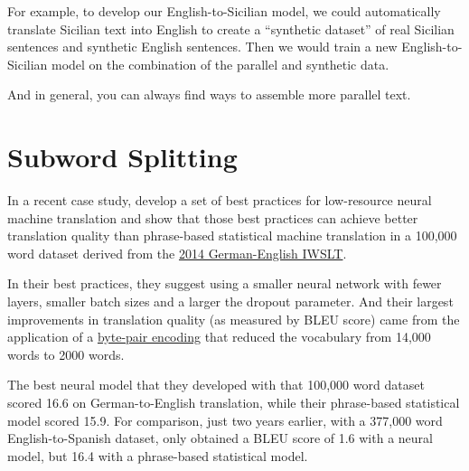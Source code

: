 \documentclass[10pt,letterpaper]{article}
\begin{document}


For example, to develop our English-to-Sicilian model, we could automatically translate
Sicilian text into English to create a ``synthetic dataset'' of real Sicilian sentences
and synthetic English sentences.  Then we would train a new English-to-Sicilian model on the
combination of the parallel and synthetic data.

And in general, you can always find ways to assemble more parallel text.



\hypertarget{subword}{}

\section*{Subword Splitting}

In a recent case study, \citet{sennrich2019loresnmt}
develop a set of best practices for low-resource neural machine translation and
show that those best practices can achieve better translation quality than
phrase-based statistical machine translation in a 100,000 word dataset derived from the
\href{https://sites.google.com/site/iwsltevaluation2014/}{2014 German-English IWSLT}.

In their best practices, they suggest using a smaller neural network with fewer layers,
smaller batch sizes and a larger the dropout parameter.  And their largest improvements
in translation quality (as measured by BLEU score) came from the application of a
\href{https://github.com/rsennrich/subword-nmt}{byte-pair encoding}
that reduced the vocabulary from 14,000 words to 2000 words.

The best neural model that they developed with that 100,000 word dataset scored 16.6
on German-to-English translation, while their phrase-based statistical model scored 15.9.
For comparison, just two years earlier, with a 377,000 word English-to-Spanish dataset,
\citet{koehnknowles2017} only obtained a BLEU score of 1.6 with a neural model,
but 16.4 with a phrase-based statistical model.
\end{document}

